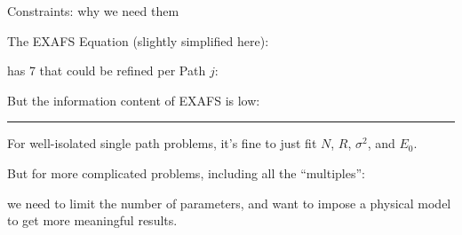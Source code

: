 \begin{slide}{Constraints: why we need them}
    
    The EXAFS Equation (slightly simplified here): 
    
    
    \vmm has 7 {} that could be refined per Path $j$:

    
    
    \vmm 
    
    But the information content of EXAFS is low:
 
  
    \vmm \hrule \vmm

    For well-isolated single path problems, it's fine to just fit $N$, $R$,
    $\sigma^2$, and $E_0$.
    
    \vmm 
    But for more complicated problems, including all the ``multiples'':

    \vmm

    {}

    \vmm
    we need to limit the number of parameters, and want to impose a
    physical model to get more meaningful results.

\vfill
\end{slide} 


